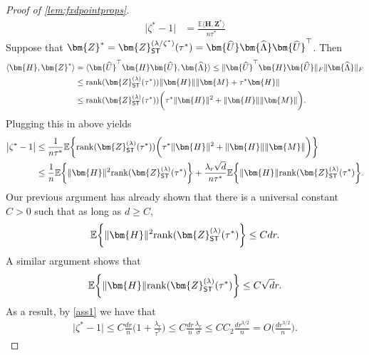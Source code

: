 \documentclass[10pt]{article}
\newcommand{\s}{^*}
\renewcommand{\t}{^{\top}}
\renewcommand{\hat}{\widehat}
\theoremstyle{definition}
\begin{document}
\begin{proof}[Proof of \cref{lem:fxdpointprops}]
\begin{align}
    \bigg| \zeta\s - 1 \bigg| &= \frac{\mathbb{E} \langle \bm{H}, \bm{Z}\s \rangle}{n \tau\s}  
\end{align}
Suppose that $\bm{Z}\s = \bm{Z}^{(\lambda/\zeta\s)}_{{\sf ST}}(\tau\s) = \bm{\hat U} \bm{\hat \Lambda} \bm{\hat U}\t$.  Then
\begin{align}
    \langle \bm{H}, \bm{Z}\s \rangle &= \langle \bm{\hat U}\t \bm{H} \bm{\hat U}, \bm{\hat \Lambda} \rangle \leq \| \bm{\hat U}\t \bm{H} \bm{\hat U} \|_F \| \bm{\hat \Lambda} \|_F \\
    &\leq \mathrm{rank}(\bm{Z}^{(\lambda)}_{{\sf ST}}(\tau\s)) \| \bm{H} \| \| \bm{M} + \tau\s \bm{H} \| \\
    &\leq \mathrm{rank}(\bm{Z}^{(\lambda)}_{{\sf ST}}(\tau\s)) \bigg( \tau\s \|\bm{H} \|^2 + \| \bm{H} \| \| \bm{M} \| \bigg).
\end{align}
Plugging this in above yields
\begin{align}
    \big| \zeta\s - 1 \big| &\leq \frac{1}{n\tau\s} \mathbb{E} \bigg\{ \mathrm{rank}(\bm{Z}^{(\lambda)}_{{\sf ST}}(\tau\s)) \bigg( \tau\s \|\bm{H} \|^2 + \| \bm{H} \| \| \bm{M} \| \bigg) \bigg\} \\
    &\leq \frac{1}{n} \mathbb{E} \bigg\{ \| \bm{H} \|^2 \mathrm{rank}(\bm{Z}^{(\lambda)}_{{\sf ST}}(\tau\s) \bigg\} + \frac{\lambda_r \sqrt{d}}{n\tau\s} \mathbb{E} \bigg\{ \| \bm{H} \| \mathrm{rank}(\bm{Z}^{(\lambda)}_{{\sf ST}}(\tau\s) \bigg\}.
\end{align}
Our previous argument has already shown that there is a universal constant $C > 0$ such that as long as $d \geq C$, 
\begin{align}
    \mathbb{E} \bigg\{ \| \bm{H} \|^2 \mathrm{rank}(\bm{Z}^{(\lambda)}_{{\sf ST}}(\tau\s) \bigg\} \leq C d r.
\end{align}
A similar argument shows that
\begin{align}
    \mathbb{E} \bigg\{ \| \bm{H} \| \mathrm{rank}(\bm{Z}^{(\lambda)}_{{\sf ST}}(\tau\s) \bigg\} \leq C \sqrt{d} r.
\end{align}
As a result, by \cref{ass1} we have that
\begin{align}
    \big| \zeta\s - 1 \big| \leq C \frac{d r}{n} \bigg( 1 + \frac{\lambda_r}{\tau\s} \bigg) \leq  C \frac{d r}{n} \frac{\lambda_r}{\sigma} \leq C C_2 \frac{d r^{3/2}}{n} = O\bigg( \frac{d r^{3/2}}{n} \bigg).
\end{align}
\end{proof}
\end{document}
